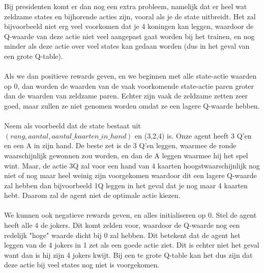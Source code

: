 \documentclass[11pt]{article}
\begin{document}
Bij presidenten komt er dan nog een extra probleem, namelijk dat er heel wat zeldzame states en bijhorende acties zijn, vooral als je de state uitbreidt. Het zal bijvoorbeeld niet erg veel voorkomen dat je 4 koningen kan leggen, waardoor de Q-waarde van deze actie niet veel aangepast gaat worden bij het trainen, en nog minder als deze actie over veel states kan gedaan worden (dus in het geval van een grote Q-table).\\\\
Als we dan positieve rewards geven, en we beginnen met alle state-actie waarden op 0, dan worden de waarden van de vaak voorkomende state-actie paren groter dan de waarden van zeldzame paren. Echter zijn vaak de zeldzame zetten zeer goed, maar zullen ze niet genomen worden omdat ze een lagere Q-waarde hebben. \\\\
Neem als voorbeeld dat de state bestaat uit $(rang, aantal, aantal\_kaarten\_in\_hand)$ en (3,2,4) is. Onze agent heeft 3 Q'en en een A in zijn hand. De beste zet is de 3 Q'en leggen, waarmee de ronde waarschijnlijk gewonnen zou worden, en dan de A leggen waarmee hij het spel wint. Maar, de actie 3Q zal voor een hand van 4 kaarten hoogstwaarschijnlijk nog niet of nog maar heel weinig zijn voorgekomen waardoor dit een lagere Q-waarde zal hebben dan bijvoorbeeld 1Q leggen in het geval dat je nog maar 4 kaarten hebt. Daarom zal de agent niet de optimale actie kiezen.\\\\
We kunnen ook negatieve rewards geven, en alles initialiseren op 0. Stel de agent heeft alle 4 de jokers. Dit komt zelden voor, waardoor de Q-waarde nog een redelijk "hoge" waarde dicht bij 0 zal hebben. Dit betekent dat de agent het leggen van de 4 jokers in 1 zet als een goede actie ziet. Dit is echter niet het geval want dan is hij zijn 4 jokers kwijt. Bij een te grote Q-table kan het dus zijn dat deze actie bij veel states nog niet is voorgekomen. 
\end{document}
